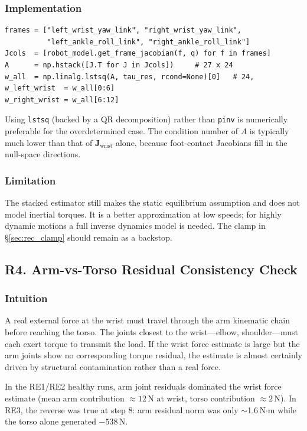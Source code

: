 \documentclass[11pt,a4paper]{article}
\newcommand{\bJ}{\bm{J}}
\begin{document}
\subsubsection*{Implementation}
\begin{lstlisting}
frames = ["left_wrist_yaw_link", "right_wrist_yaw_link",
          "left_ankle_roll_link", "right_ankle_roll_link"]
Jcols  = [robot_model.get_frame_jacobian(f, q) for f in frames]
A      = np.hstack([J.T for J in Jcols])     # 27 x 24
w_all  = np.linalg.lstsq(A, tau_res, rcond=None)[0]   # 24,
w_left_wrist  = w_all[0:6]
w_right_wrist = w_all[6:12]
\end{lstlisting}
Using \texttt{lstsq} (backed by a QR decomposition) rather than
\texttt{pinv} is numerically preferable for the overdetermined case.
The condition number of $A$ is typically much lower than that of
$\bJ_\text{wrist}$ alone, because foot-contact Jacobians fill in
the null-space directions.

\subsubsection*{Limitation}
The stacked estimator still makes the static equilibrium assumption and
does not model inertial torques.  It is a better approximation at low
speeds; for highly dynamic motions a full inverse dynamics model is
needed.  The clamp in \S\ref{sec:rec_clamp} should remain as a backstop.

\subsection{R4. Arm-vs-Torso Residual Consistency Check}
\label{sec:rec_armcheck}

\subsubsection*{Intuition}
A real external force at the wrist must travel through the arm kinematic
chain before reaching the torso.  The joints closest to the wrist---elbow,
shoulder---must each exert torque to transmit the load.  If the wrist force
estimate is large but the arm joints show no corresponding torque residual,
the estimate is almost certainly driven by structural contamination rather
than a real force.

In the RE1/RE2 healthy runs, arm joint residuals dominated the wrist force
estimate (mean arm contribution $\approx 12$\,N at wrist, torso contribution
$\approx 2$\,N).  In RE3, the reverse was true at step 8: arm residual norm
was only $\sim$1.6\,N$\cdot$m while the torso alone generated $-538$\,N.
\end{document}

